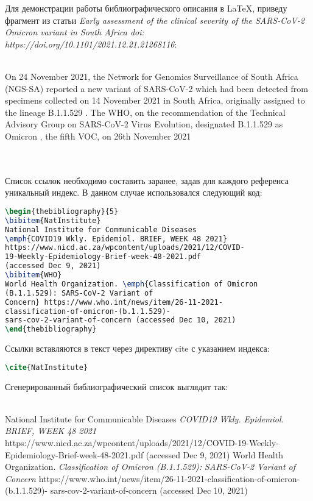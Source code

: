 \documentclass[a4paper]{article}
\newcommand{\cbox}[2][green]{%
  \colorbox{#1}{\parbox{\dimexpr\linewidth-2\fboxsep}{\strut #2\strut}}%
}
\begin{document}
Для демонстрации работы библиографического описания в \LaTeX, приведу фрагмент из статьи \emph{Early assessment of the clinical severity of the SARS-CoV-2 Omicron variant in South Africa doi: https://doi.org/10.1101/2021.12.21.21268116}:
\\
\\
\cbox[lightgray!90]{On 24 November 2021, the Network for Genomics Surveillance of South Africa (NGS-SA) reported a new variant of SARS-CoV-2 which had been detected from specimens collected on 14 November 2021 in South Africa, originally assigned to the lineage B.1.1.529 \cite{NatInstitute}. The WHO, on the recommendation of the Technical Advisory Group on SARS-CoV-2 Virus Evolution, designated B.1.1.529 as Omicron \cite{WHO}, the fifth VOC, on 26th November 2021}
\\\\
Список ссылок необходимо составить заранее, задав для каждого референса уникальный индекс. В данном случае использовался следующий код:
\begin{lstlisting}[language=TeX]
\begin{thebibliography}{5}
\bibitem{NatInstitute}
National Institute for Communicable Diseases 
\emph{COVID19 Wkly. Epidemiol. BRIEF, WEEK 48 2021} 
https://www.nicd.ac.za/wpcontent/uploads/2021/12/COVID-
19-Weekly-Epidemiology-Brief-week-48-2021.pdf 
(accessed Dec 9, 2021)
\bibitem{WHO}
World Health Organization. \emph{Classification of Omicron 
(B.1.1.529): SARS-CoV-2 Variant of
Concern} https://www.who.int/news/item/26-11-2021-
classification-of-omicron-(b.1.1.529)-
sars-cov-2-variant-of-concern (accessed Dec 10, 2021)
\end{thebibliography}
\end{lstlisting}

Ссылки вставляются в текст через директиву cite с указанием индекса:
\begin{lstlisting}[language=TeX]
\cite{NatInstitute}
\end{lstlisting}
\thispagestyle{empty}
\newpage
Сгенерированный библиографический список выглядит так:\\\\
\cbox[lightgray!90]{
\begin{thebibliography}{5}
\bibitem{NatInstitute}
National Institute for Communicable Diseases \emph{COVID19 Wkly. Epidemiol. BRIEF, WEEK 48 2021} https://www.nicd.ac.za/wpcontent/uploads/2021/12/COVID-19-Weekly-Epidemiology-Brief-week-48-2021.pdf (accessed Dec 9, 2021)
\bibitem{WHO}
World Health Organization. \emph{Classification of Omicron (B.1.1.529): SARS-CoV-2 Variant of
Concern} https://www.who.int/news/item/26-11-2021-classification-of-omicron-(b.1.1.529)-
sars-cov-2-variant-of-concern (accessed Dec 10, 2021)
\end{thebibliography}
}
\end{document}
